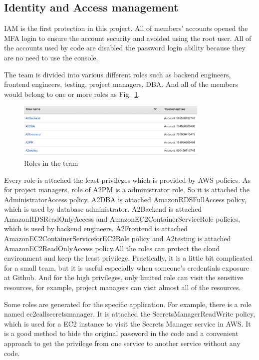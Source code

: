 \documentclass[conference]{IEEEtran}
\begin{document}
\subsection{Identity and Access management}

IAM is the first protection in this project. All of members' accounts opened the MFA login to ensure the account security and avoided using the root user. 
All of the accounts used by code are disabled the password login ability because they are no need to use the console. 

The team is divided into various different roles such as backend engineers, frontend engineers, 
testing, project managers, DBA. And all of the members would belong to one or more roles as Fig.~\ref{roles}. 

\begin{figure}[htbp]
    \centerline{\includegraphics[width=260pt]{images/roles.png}}
    \caption{Roles in the team}
    \label{roles}
\end{figure}

Every role is attached the least privileges which is provided by AWS policies. As for project managers, role of A2PM is a administrator role. So it is 
attached the AdministratorAccess policy. A2DBA is attached AmazonRDSFullAccess policy, which is used by database administrator. A2Backend is attached 
AmazonRDSReadOnlyAccess and AmazonEC2ContainerServiceRole policies, which is used by backend engineers. A2Frontend is attached AmazonEC2ContainerServiceforEC2Role 
policy and A2testing is attached AmazonEC2ReadOnlyAccess policy.All the roles can protect the cloud environment and keep the least privilege. Practically, it is 
a little bit complicated for a small team, but it is useful especially when someone's credentials exposure at Github. And for the high privileges, only 
limited role can visit the sensitive resources, for example, project managers can visit almost all of the resources.

Some roles are generated for the specific application. For example, there is a role named ec2callsecretsmanager. It is attached the SecretsManagerReadWrite 
policy, which is used for a EC2 instance to visit the Secrets Manager service in AWS. It is a good method to hide the original password in the code and a 
convenient approach to get the privilege from one service to another service without any code.
\end{document}
